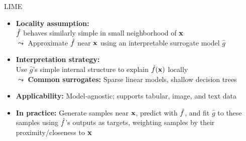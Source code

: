 \documentclass[10pt,compress,t,notes=noshow, xcolor=table]{beamer}
\newcommand{\gh}{\hat{g}}
\begin{document}
\begin{frame}[t]{LIME}
  \begin{itemize}%
    \item \textbf{Locality assumption:} \\$\hat{f}$ behaves similarly simple in small neighborhood of $\mathbf{x}$\\
    $\leadsto$ Approximate $\hat{f}$ near $\mathbf{x}$ using an interpretable surrogate model $\gh$
    \item \textbf{Interpretation strategy:}\\ Use $\gh$'s simple internal structure to explain $\hat{f}(\mathbf{x})$ locally\\
    $\leadsto$ \textbf{Common surrogates:} Sparse linear models, shallow decision trees
    \item \textbf{Applicability:} Model‑agnostic; supports tabular, image, and text data %
    \item \textbf{In practice:} Generate samples near $\mathbf{x}$, predict with $\hat{f}$, and fit $\gh$ to these samples using $\hat{f}$’s outputs as targets, weighting samples by their proximity/closeness to $\mathbf{x}$

  \end{itemize}
\end{frame}


\end{document}
